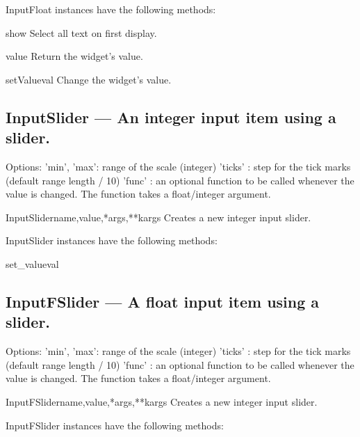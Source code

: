 InputFloat instances have the following methods:

\begin{funcdesc}{show}{}
Select all text on first display.
\end{funcdesc}

\begin{funcdesc}{value}{}
Return the widget's value.
\end{funcdesc}

\begin{funcdesc}{setValue}{val}
Change the widget's value.
\end{funcdesc}

\subsection{InputSlider --- An integer input item using a slider.}
    Options:
      'min', 'max': range of the scale (integer)
      'ticks'     : step for the tick marks (default range length / 10)
      'func'      : an optional function to be called whenever the value is
                    changed. The function takes a float/integer argument.
    

\begin{classdesc}{InputSlider}{name,value,*args,**kargs}
Creates a new integer input slider.
\end{classdesc}

InputSlider instances have the following methods:

\begin{funcdesc}{set_value}{val}

\end{funcdesc}

\subsection{InputFSlider --- A float input item using a slider.}
    Options:
      'min', 'max': range of the scale (integer)
      'ticks'     : step for the tick marks (default range length / 10)
      'func'      : an optional function to be called whenever the value is
                    changed. The function takes a float/integer argument.
    

\begin{classdesc}{InputFSlider}{name,value,*args,**kargs}
Creates a new integer input slider.
\end{classdesc}

InputFSlider instances have the following methods:


